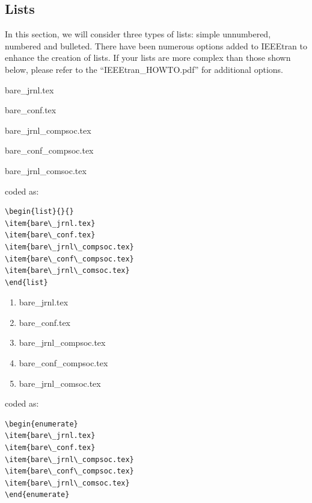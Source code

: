 \documentclass[lettersize,journal]{IEEEtran}
\begin{document}
\subsection{Lists}
\noindent In this section, we will consider three types of lists: simple unnumbered, numbered and bulleted. There have been numerous options added to IEEEtran to enhance the creation of lists. If your lists are more complex than those shown below, please refer to the  ``IEEEtran\_HOWTO.pdf'' for additional options.\\


\begin{list}{}{}
\item{bare\_jrnl.tex}
\item{bare\_conf.tex}
\item{bare\_jrnl\_compsoc.tex}
\item{bare\_conf\_compsoc.tex}
\item{bare\_jrnl\_comsoc.tex}
\end{list}

\noindent coded as:
\begin{verbatim}
\begin{list}{}{}
\item{bare\_jrnl.tex}
\item{bare\_conf.tex}
\item{bare\_jrnl\_compsoc.tex}
\item{bare\_conf\_compsoc.tex}
\item{bare\_jrnl\_comsoc.tex}
\end{list}
\end{verbatim}

\begin{enumerate}
\item{bare\_jrnl.tex}
\item{bare\_conf.tex}
\item{bare\_jrnl\_compsoc.tex}
\item{bare\_conf\_compsoc.tex}
\item{bare\_jrnl\_comsoc.tex}
\end{enumerate}
\noindent coded as: 
\begin{verbatim}
\begin{enumerate}
\item{bare\_jrnl.tex}
\item{bare\_conf.tex}
\item{bare\_jrnl\_compsoc.tex}
\item{bare\_conf\_compsoc.tex}
\item{bare\_jrnl\_comsoc.tex}
\end{enumerate}
\end{verbatim}
\end{document}

